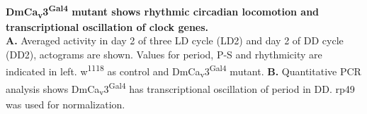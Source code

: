 \label{fig:4}
\textbf{DmCa\textsubscript{v}3\textsuperscript{Gal4} mutant shows rhythmic circadian locomotion and transcriptional oscillation of clock genes.}
\\
\textbf{A.} Averaged activity in day 2 of three LD cycle (LD2) and day 2 of DD cycle (DD2), actograms are shown.
Values for period, P-S and rhythmicity are indicated in left.
w\textsuperscript{1118} as control and DmCa\textsubscript{v}3\textsuperscript{Gal4} mutant.
\textbf{B.} Quantitative PCR analysis shows DmCa\textsubscript{v}3\textsuperscript{Gal4} has transcriptional oscillation of period in DD.
rp49 was used for normalization.